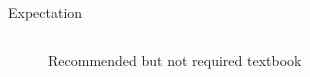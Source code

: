 \documentclass[11pt,aspectratio=43]{beamer}
\let\olditemize=\itemize
\let\endolditemize=\enditemize
\renewenvironment{itemize}{\olditemize \itemsep1em}{\endolditemize}
\theoremstyle{definition}
\begin{document}
\begin{frame}{Expectation}
\begin{columns}
\begin{column}{0.4\textwidth}
\begin{figure}
                \caption{Recommended but not required textbook}
            \end{figure}
        \end{column}
    \end{columns}
\end{frame}

\end{document}
